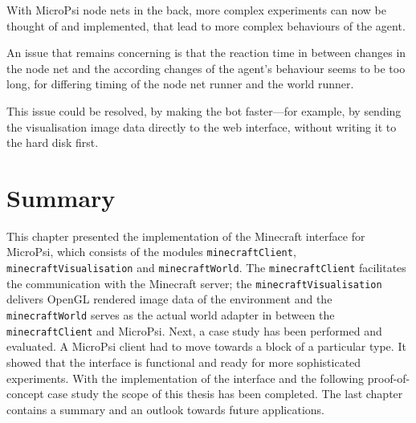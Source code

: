 With MicroPsi node nets in the back, more complex experiments can now be thought of and implemented, that lead to more complex behaviours of the agent.

An issue that remains concerning is that the reaction time in between changes in the node net and the according changes of the agent's behaviour seems to be too long, for differing timing of the node net runner and the world runner.

This issue could be resolved, by making the bot faster---for example, by sending the visualisation image data directly to the web interface, without writing it to the hard disk first.

    \section{Summary}
This chapter presented the implementation of the Minecraft interface for MicroPsi, which consists of the modules \texttt{minecraftClient}, \texttt{minecraftVisualisation} and \texttt{minecraftWorld}. The \texttt{minecraftClient} facilitates the communication with the Minecraft server; the \texttt{minecraftVisualisation} delivers OpenGL rendered image data of the environment and the \texttt{minecraftWorld} serves as the actual world adapter in between the \texttt{minecraftClient} and MicroPsi.
Next, a case study has been performed and evaluated. A MicroPsi client had to move towards a block of a particular type. It showed that the interface is functional and ready for more sophisticated experiments.
With the implementation of the interface and the following proof-of-concept case study the scope of this thesis has been completed. The last chapter contains a summary and an outlook towards future applications.